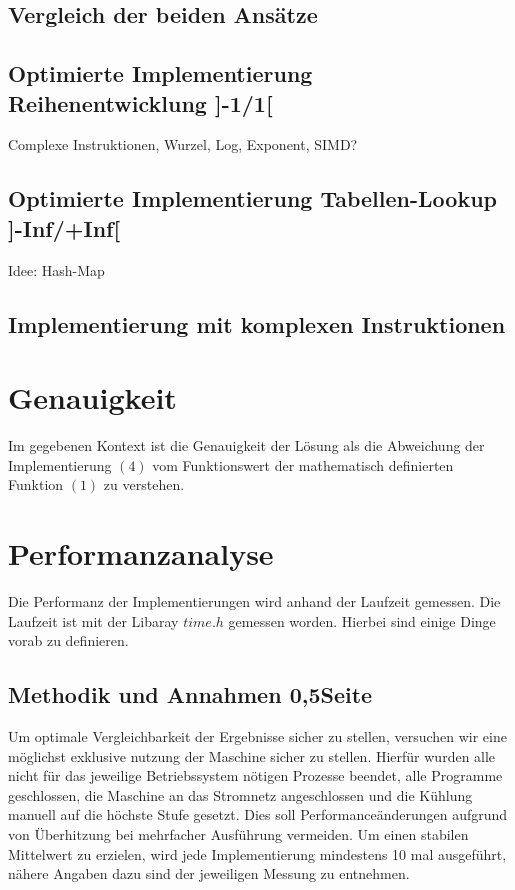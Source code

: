 \documentclass[course=erap]{aspdoc}
\begin{document}
    \subsection{Vergleich der beiden Ansätze}

    \subsection{Optimierte Implementierung Reihenentwicklung ]-1/1[}
    Complexe Instruktionen, Wurzel, Log, Exponent, SIMD?

    \subsection{Optimierte Implementierung Tabellen-Lookup ]-Inf/+Inf[}
    Idee: Hash-Map

    \subsection{Implementierung mit komplexen Instruktionen}


    \section{Genauigkeit}
    Im gegebenen Kontext ist die Genauigkeit der Lösung als die Abweichung der Implementierung $(4)$ vom Funktionswert der mathematisch definierten Funktion $(1)$ zu verstehen.


    \section{Performanzanalyse}
    Die Performanz der Implementierungen wird anhand der Laufzeit gemessen.
    Die Laufzeit ist mit der Libaray $time.h$ gemessen worden.
    Hierbei sind einige Dinge vorab zu definieren.

    \subsection{Methodik und Annahmen 0,5Seite}
    Um optimale Vergleichbarkeit der Ergebnisse sicher zu stellen, versuchen wir eine möglichst exklusive nutzung der Maschine sicher zu stellen.
    Hierfür wurden alle nicht für das jeweilige Betriebssystem nötigen Prozesse beendet, alle Programme geschlossen, die Maschine an das Stromnetz angeschlossen und die Kühlung manuell auf die höchste Stufe gesetzt.
    Dies soll Performanceänderungen aufgrund von Überhitzung bei mehrfacher Ausführung vermeiden.
    Um einen stabilen Mittelwert zu erzielen, wird jede Implementierung mindestens 10 mal ausgeführt, nähere Angaben dazu sind der jeweiligen Messung zu entnehmen.
\end{document}
